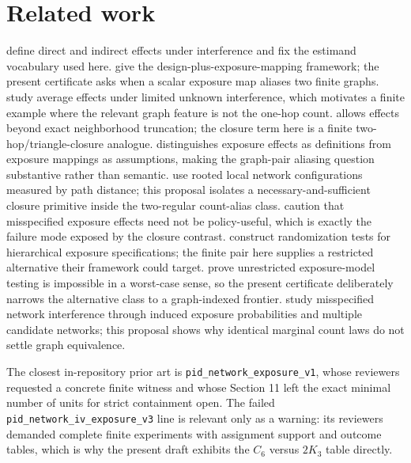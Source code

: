 \documentclass[11pt]{article}
\theoremstyle{definition}
\theoremstyle{plain}
\theoremstyle{remark}
\begin{document}
\section{Related work}
\citet{hudgens_halloran_2008_jasa} define direct and indirect effects under interference and fix the estimand vocabulary used here. \citet{aronow_samii_2017_general_interference} give the design-plus-exposure-mapping framework; the present certificate asks when a scalar exposure map aliases two finite graphs. \citet{savje_aronow_hudgens_2021_unknown_interference} study average effects under limited unknown interference, which motivates a finite example where the relevant graph feature is not the one-hop count. \citet{leung_2022_approximate_neighborhood_interference} allows effects beyond exact neighborhood truncation; the closure term here is a finite two-hop/triangle-closure analogue. \citet{savje_2024_misspecified_exposure} distinguishes exposure effects as definitions from exposure mappings as assumptions, making the graph-pair aliasing question substantive rather than semantic. \citet[abstract and \S2]{auerbach_guo_tabordmeehan_2026_local_approach} use rooted local network configurations measured by path distance; this proposal isolates a necessary-and-sufficient closure primitive inside the two-regular count-alias class. \citet{auerbach_auerbach_tabordmeehan_2024_policy_usefulness} caution that misspecified exposure effects need not be policy-useful, which is exactly the failure mode exposed by the closure contrast. \citet{hoshino_yanagi_2023_specification_test} construct randomization tests for hierarchical exposure specifications; the finite pair here supplies a restricted alternative their framework could target. \citet{gao_harshaw_savje_wang_2026_impossibility_testing} prove unrestricted exposure-model testing is impossible in a worst-case sense, so the present certificate deliberately narrows the alternative class to a graph-indexed frontier. \citet{weinstein_nevo_2026_misspecified_network} study misspecified network interference through induced exposure probabilities and multiple candidate networks; this proposal shows why identical marginal count laws do not settle graph equivalence.

The closest in-repository prior art is \texttt{pid\_network\_exposure\_v1}, whose reviewers requested a concrete finite witness and whose Section 11 left the exact minimal number of units for strict containment open. The failed \texttt{pid\_network\_iv\_exposure\_v3} line is relevant only as a warning: its reviewers demanded complete finite experiments with assignment support and outcome tables, which is why the present draft exhibits the \(C_6\) versus \(2K_3\) table directly.
\end{document}
